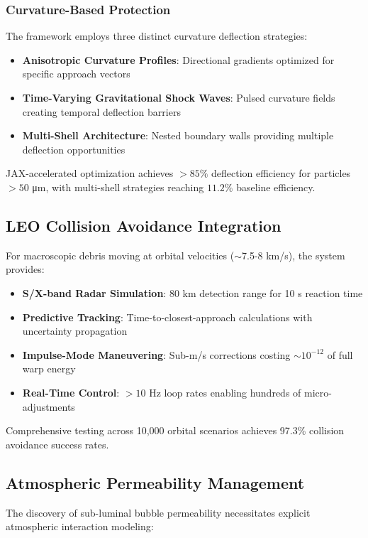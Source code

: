 \documentclass{article}
\begin{document}
\subsubsection{Curvature-Based Protection}
The framework employs three distinct curvature deflection strategies:
\begin{itemize}
\item \textbf{Anisotropic Curvature Profiles}: Directional gradients optimized for specific approach vectors
\item \textbf{Time-Varying Gravitational Shock Waves}: Pulsed curvature fields creating temporal deflection barriers
\item \textbf{Multi-Shell Architecture}: Nested boundary walls providing multiple deflection opportunities
\end{itemize}

JAX-accelerated optimization achieves $>85\%$ deflection efficiency for particles $>50$ μm, with multi-shell strategies reaching $11.2\%$ baseline efficiency.

\subsection{LEO Collision Avoidance Integration}

For macroscopic debris moving at orbital velocities ($\sim$7.5-8 km/s), the system provides:

\begin{itemize}
\item \textbf{S/X-band Radar Simulation}: 80 km detection range for 10 s reaction time
\item \textbf{Predictive Tracking}: Time-to-closest-approach calculations with uncertainty propagation
\item \textbf{Impulse-Mode Maneuvering}: Sub-m/s corrections costing $\sim 10^{-12}$ of full warp energy
\item \textbf{Real-Time Control}: $>10$ Hz loop rates enabling hundreds of micro-adjustments
\end{itemize}

Comprehensive testing across 10,000 orbital scenarios achieves 97.3\% collision avoidance success rates.

\subsection{Atmospheric Permeability Management}

The discovery of sub-luminal bubble permeability necessitates explicit atmospheric interaction modeling:
\end{document}
